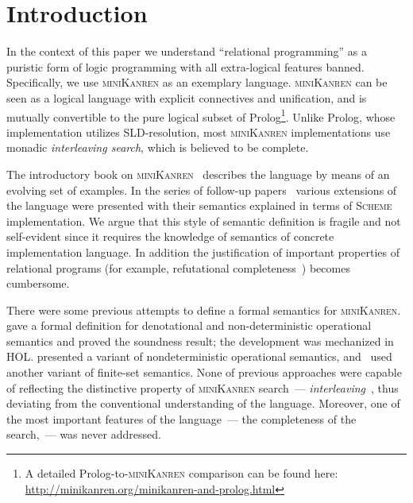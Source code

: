 \section{Introduction}

In the context of this paper we understand ``relational programming'' as a puristic form of logic programming with all extra-logical
features banned. Specifically, we use \textsc{miniKanren} as an exemplary language. \textsc{miniKanren} can be seen as
a logical language with explicit connectives and unification, and is mutually convertible to the pure logical subset of
Prolog\footnote{A detailed Prolog-to-\textsc{miniKanren} comparison can be found here: \url{http://minikanren.org/minikanren-and-prolog.html}}.
Unlike Prolog, whose implementation utilizes SLD-resolution, most \textsc{miniKanren} implementations use monadic \emph{interleaving
search}, which is believed to be complete.

The introductory book on \textsc{miniKanren}~\cite{TRS} describes the language by means of an evolving set of examples. In the
series of follow-up papers~\cite{MicroKanren,CKanren,CKanren1,AlphaKanren,2016,Guided} various extensions of the language were presented with
their semantics explained in terms of \textsc{Scheme} implementation. We argue that this style of semantic definition is
fragile and not self-evident since it requires the knowledge of semantics of concrete implementation language. In addition the justification of
important properties of relational programs (for example, refutational completeness~\cite{WillThesis}) becomes cumbersome.

There were some previous attempts to define a formal semantics for \textsc{miniKanren}. \citet{MechanisingMiniKanren} gave a formal definition
for denotational and non-deterministic operational semantics and proved the soundness result; the development was mechanized in HOL. 
\citet{RelConversion} presented a variant of nondeterministic operational semantics, and~\citet{DivTest} used another variant of finite-set semantics.
None of previous approaches were capable of reflecting the distinctive property of \textsc{miniKanren} search~--- \emph{interleaving}~\cite{Search},
thus deviating from the conventional understanding of the language. Moreover, one of the most important features of the
language~--- the completeness of the search,~--- was never addressed.

